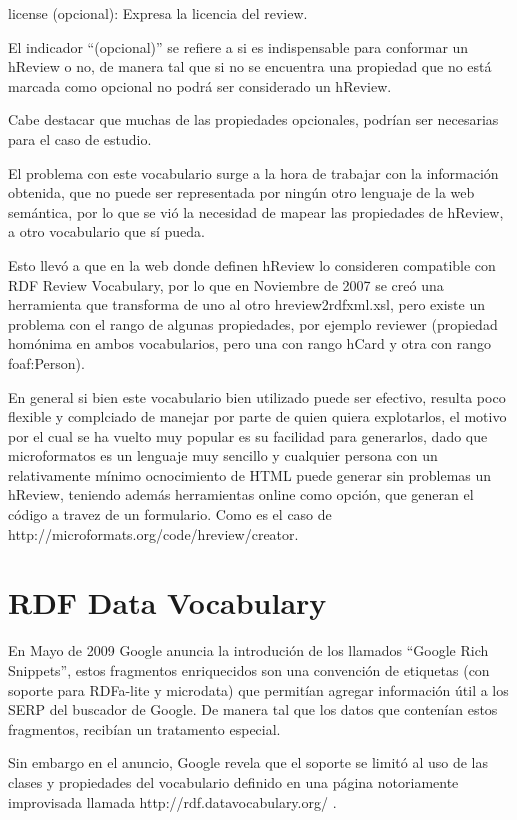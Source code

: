 license (opcional): Expresa la licencia del review.

El indicador ``(opcional)'' se refiere a si es indispensable para conformar un hReview o no, de manera tal que si no se encuentra una 
propiedad que no está marcada como opcional no podrá ser considerado un hReview.

Cabe destacar que muchas de las propiedades opcionales, podrían ser necesarias para el caso de estudio.

El problema con este vocabulario surge a la hora de trabajar con la información obtenida, que no puede ser representada por ningún otro 
lenguaje de la web semántica, por lo que se vió la necesidad de mapear las propiedades de hReview, a otro vocabulario que sí pueda.

Esto llevó a que en la web donde definen hReview lo consideren compatible con RDF Review Vocabulary, por lo que en Noviembre de 2007 
se creó una herramienta que transforma de uno al otro hreview2rdfxml.xsl,  pero existe un problema con el rango de algunas 
propiedades, por ejemplo reviewer (propiedad homónima en ambos vocabularios, pero una con rango hCard y otra con rango foaf:Person).

En general si bien este vocabulario bien utilizado puede ser efectivo, resulta poco flexible y complciado de manejar por parte 
de quien quiera explotarlos, el motivo por el cual se ha vuelto muy popular es su facilidad para generarlos, dado que 
microformatos es un lenguaje muy sencillo y cualquier persona con un relativamente mínimo ocnocimiento de HTML puede generar 
sin problemas un hReview, teniendo además herramientas online como opción, que generan el código a travez de un formulario. 
Como es el caso de http://microformats.org/code/hreview/creator. 


\section{RDF Data Vocabulary}
\label{section:data-vocabulary}


En Mayo de 2009 Google anuncia la introdución de los llamados ``Google Rich Snippets'', estos fragmentos enriquecidos son una convención 
de etiquetas (con soporte para RDFa-lite y microdata) que permitían agregar información útil a los SERP del buscador de Google. De manera tal 
que los datos que contenían estos fragmentos, recibían un tratamento especial.

Sin embargo en el anuncio, Google revela que el soporte se limitó al uso de las clases y propiedades del vocabulario definido en una página 
notoriamente improvisada llamada http://rdf.datavocabulary.org/ . 


